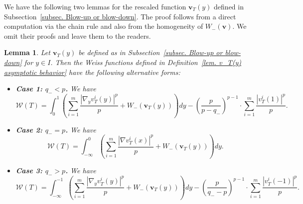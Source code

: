 \documentclass[11pt,twoside,reqno]{amsart}
\newtheorem{lemma}{Lemma}[section]
\numberwithin{equation}{section}
\begin{document}
We have the following two lemmas for the rescaled function $\mathbf{v}_{T}(y)$ defined in Subsection~\ref{subsec. Blow-up or blow-down}. The proof follows from a direct computation via the chain rule and also from the homogeneity of $W_{-}(\mathbf{v})$. We omit their proofs and leave them to the readers.
\begin{lemma}\label{lem. rescaled Weiss function}
    Let $\mathbf{v}_{T}(y)$ be defined as in Subsection~\ref{subsec. Blow-up or blow-down} for $y\in I$. Then the Weiss functions defined in Definition~\ref{lem. v_T(y) asymptotic behavior} have the following alternative forms:
    \begin{itemize}\item \textbf{Case 1: $q_{-}<p$.} We have
    \begin{equation*}
        \mathcal{W}(T)=\int_0^1 \left(\sum_{i=1}^m \frac{|\nabla_y v_T^i(y)|^p}{p}+W_{-}(\mathbf{v}_T(y)) \right) dy-\left(\frac{p}{p-q_{-}}\right)^{p-1}\cdot\sum_{i=1}^{m}\frac{|v^i_T(1)|^p}{p}.
    \end{equation*}
    \item \textbf{Case 2: $q_{-}=p$.} We have
    \begin{equation*}
        \mathcal{W}(T)= \int_{-\infty}^0 \left(\sum_{i=1}^m \frac{|\nabla v^i_T(x)|^p}{p}+W_{-}(\mathbf{v}_T(y)) \right) dy.
    \end{equation*}
    \item \textbf{Case 3: $q_{-}>p$.} We have
 \begin{equation*}
        \mathcal{W}(T)= \int_{-\infty}^{-1} \left(\sum_{i=1}^m \frac{|\nabla_y v_T^i(y)|^p}{p}+W_{-}(\mathbf{v}_T(y)) \right) dy-\left(\frac{p}{q_{-}-p}\right)^{p-1}\cdot\sum_{i=1}^{m}\frac{|v^i_T(-1)|^p}{p}.
    \end{equation*}
    \end{itemize}
\end{lemma}
\end{document}

